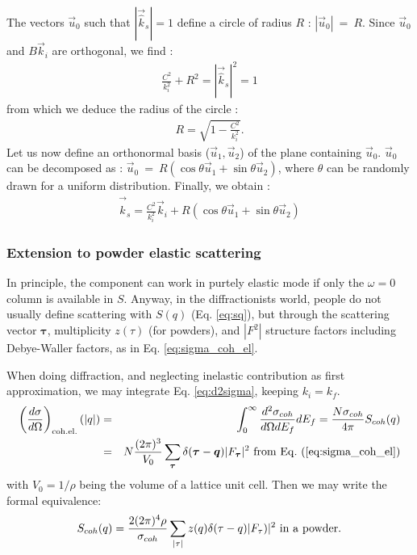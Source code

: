 The vectors $\vec{u}_0$ such that $|\vec{\hat k}_s| = 1$ define a circle of radius $R$ : $|\vec{u}_0|~=~R$.
Since $\vec{u}_0$ and $B \vec{k}_i$ are orthogonal, we find :
\begin{align}
\frac{C^2}{k_i^2} + R^2 = |\vec{\hat k}_s|^2 = 1
\end{align}
from which we deduce the radius of the circle :
\begin{align}
R = \sqrt{1 - \frac{C^2}{k_i^2}}.
\end{align}
Let us now define an orthonormal basis ($\vec{u}_1,\vec{u}_2$) of the plane containing $\vec{u}_0$.
$\vec{u}_0$ can be decomposed as : $\vec{u}_0~=~R(\cos \theta \vec{u}_1 + \sin \theta \vec{u}_2)$, where $\theta$ can be randomly drawn for a uniform distribution.
Finally, we obtain :
\begin{align}
\vec{\hat k}_s = \frac{C^2}{k_i^2} \vec{k}_i + R (\cos \theta \vec{u}_1 + \sin \theta \vec{u}_2)
\end{align}

\subsubsection{Extension to powder elastic scattering}

In principle, the component can work in purtely elastic mode if only the $\omega = 0$ column is available in $S$.
Anyway, in the diffractionists world, people do not usually define scattering with $S(q)$ (Eq. \ref{eq:sq}), but through the scattering vector $\boldsymbol{\tau}$, multiplicity $z(\tau)$ (for powders), and $|F^2|$ structure factors including Debye-Waller factors, as in Eq. \ref{eq:sigma_coh_el}.

When doing diffraction, and neglecting inelastic contribution as first approximation, we may integrate Eq. \ref{eq:d2sigma}, keeping $k_i = k_f$.
\begin{eqnarray}
\left(\frac{d\sigma}{d\Omega}\right)_{\rm coh.el.}(|q|) &=& \int_0^\infty \frac{d^2\sigma_{coh}}{d\Omega dE_f} dE_f = \frac{N \sigma_{coh}}{4\pi} S_{coh}(q) \\
& = & N\frac{(2\pi)^3}{V_0}\sum_{\boldsymbol{\tau}} \delta(\boldsymbol{\tau} - \boldsymbol{q})|F_{\boldsymbol{\tau}}|^2 {\rm\ from\ Eq.\ (\ref{eq:sigma_coh_el})}
\end{eqnarray}
with $V_0 = 1/\rho$ being the volume of a lattice unit cell. Then we may write the formal equivalence:
\begin{eqnarray}\label{eq:sq-F2}
S_{coh}(q) = \frac{2(2\pi)^4\rho}{\sigma_{coh}} \sum_{|\tau|} z(q) \delta(\tau - q) |F_\tau)|^2 {\rm\ in\ a\ powder.}
\end{eqnarray}

